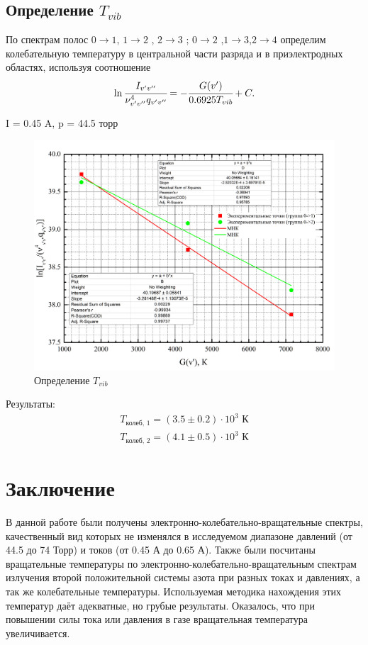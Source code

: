 \documentclass[a4paper,12pt]{article}
\begin{document}
	
		

\newpage
	\subsection{Определение $T_{vib}$}
По спектрам полос $0\to1$, $1\to2$ , $2 \to3$ ; $0 \to 2$ ,$1\to 3$,$2 \to 4$ определим
колебательную температуру в центральной части разряда и в приэлектродных
областях, используя соотношение
\begin{equation}
\ln\cfrac{I_{v'v''}}{\nu^4_{v'v''}q_{v'v''}} = -\cfrac{G(v')}{0.6925 T_{vib}} +C.
\end{equation}
	

		\begin{center}
		 I = 0.45 A, p = 44.5 торр
		\end{center}       
		\begin{figure}[H]
		\begin{center}
			\includegraphics[scale=0.4]{vib}
			\caption{Определение $T_{vib}$}
		\end{center}
	\end{figure}
	
Результаты:
	\begin{eqnarray}
	T_{\text{колеб, 1}} = (3.5\pm0.2)\cdot10^3 \text{ К}\\
	T_{\text{колеб, 2}} = (4.1\pm0.5)\cdot10^3 \text{ К}
	\end{eqnarray}
	
	\section{Заключение}
	В данной работе были получены электронно-колебательно-вращательные спектры, качественный вид которых не изменялся в исследуемом диапазоне давлений (от 44.5 до 74 Торр) и токов (от
0.45 А до 0.65 А). Также были посчитаны вращательные температуры по электронно-колебательно-вращательным спектрам излучения второй положительной системы азота при разных токах и
давлениях, а так же колебательные температуры. Используемая методика нахождения этих температур даёт адекватные, но грубые результаты. Оказалось, что при повышении силы тока или
давления в газе вращательная температура увеличивается.
	
\end{document}
